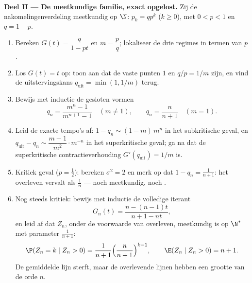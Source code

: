 \begin{problem}
\medskip
\noindent\textbf{Deel II --- De meetkundige familie, exact
opgelost.} Zij de nakomelingenverdeling meetkundig op $\N$: $p_k =
qp^k$ ($k \geq 0$), met $0 < p < 1$ en $q = 1 - p$.
\begin{enumerate}[resume]
  \item Bereken $G(t) = \dfrac{q}{1 - pt}$ en $m = \dfrac pq$;
        lokaliseer de drie regimes in termen van $p$.
  \item Los $G(t) = t$ op: toon aan dat de vaste punten $1$ en
        $q/p = 1/m$ zijn, en vind de uitstervingskans
        $q_{\mathrm{uit}} = \min(1, 1/m)$ terug.
  \item Bewijs met inductie de gesloten vormen
        \[
        q_n = \frac{m^n - 1}{m^{n+1} - 1} \quad (m \neq 1),
        \qquad
        q_n = \frac{n}{n+1} \quad (m = 1).
        \]
  \item Leid de exacte tempo's af: $1 - q_n \sim (1 - m)\,m^n$ in
        het subkritische geval, en $q_{\mathrm{uit}} - q_n \sim
        \dfrac{m - 1}{m^{2}}\cdot m^{-n}$ in het superkritische
        geval; ga na dat de superkritische contractieverhouding
        $G'(q_{\mathrm{uit}}) = 1/m$ is.
  \item Kritiek geval ($p = \tfrac12$): bereken $\sigma^2 = 2$ en
        merk op dat $1 - q_n = \frac1{n+1}$: het overleven vervalt
        als $\frac1n$ --- noch meetkundig, noch .
  \item Nog steeds kritiek: bewijs met inductie de volledige
        iterant
        \[
        G_n(t) = \frac{n - (n-1)t}{n + 1 - nt},
        \]
        en leid af dat $Z_n$, onder de voorwaarde van overleven,
        meetkundig is op $\N^*$ met parameter $\frac1{n+1}$:
        \[
        \P(Z_n = k \mid Z_n > 0) = \frac1{n+1}
        \Bigl(\frac{n}{n+1}\Bigr)^{k-1},
        \qquad
        \E(Z_n \mid Z_n > 0) = n + 1 .
        \]
        De gemiddelde lijn sterft, maar de overlevende lijnen
        hebben een grootte van de orde $n$.
\end{enumerate}


\end{problem}
